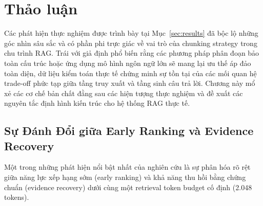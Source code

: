 
\section{Thảo luận}
\label{sec:discussion}

Các phát hiện thực nghiệm được trình bày tại Mục~\ref{sec:results} đã bộc lộ những góc nhìn sâu sắc và có phần phi trực giác về vai trò của chunking strategy trong chu trình RAG. Trái với giả định phổ biến rằng các phương pháp phân đoạn bảo toàn cấu trúc hoặc ứng dụng mô hình ngôn ngữ lớn sẽ mang lại ưu thế áp đảo toàn diện, dữ liệu kiểm toán thực tế chứng minh sự tồn tại của các mối quan hệ trade-off phức tạp giữa tầng truy xuất và tầng sinh câu trả lời. Chương này mổ xẻ các cơ chế bản chất đằng sau các hiện tượng thực nghiệm và đề xuất các nguyên tắc định hình kiến trúc cho hệ thống RAG thực tế.

\subsection{Sự Đánh Đổi giữa Early Ranking và Evidence Recovery}
\label{subsec:ranking_vs_evidence_tradeoff}

Một trong những phát hiện nổi bật nhất của nghiên cứu là sự phân hóa rõ rệt giữa năng lực xếp hạng sớm (early ranking) và khả năng thu hồi bằng chứng chuẩn (evidence recovery) dưới cùng một retrieval token budget cố định (2.048 tokens).

